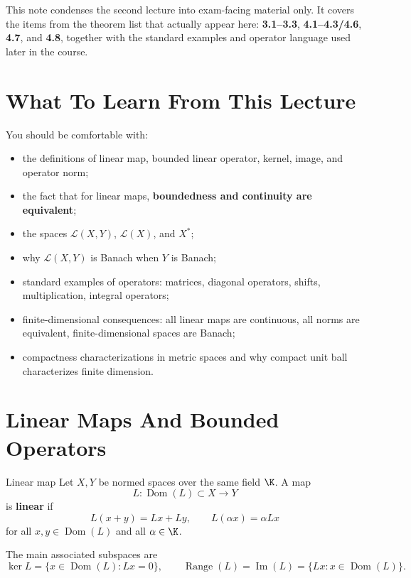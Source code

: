 \documentclass[11pt]{article}
\begin{document}

\vspace{0.8em}

\begin{focusbox}
This note condenses the second lecture into exam-facing material only. It covers the items from the theorem list that actually appear here: \textbf{3.1--3.3}, \textbf{4.1--4.3/4.6}, \textbf{4.7}, and \textbf{4.8}, together with the standard examples and operator language used later in the course.
\end{focusbox}

\tableofcontents

\section{What To Learn From This Lecture}

\begin{focusbox}
You should be comfortable with:
\begin{itemize}
\item the definitions of linear map, bounded linear operator, kernel, image, and operator norm;
\item the fact that for linear maps, \textbf{boundedness and continuity are equivalent};
\item the spaces $\mathcal L(X,Y)$, $\mathcal L(X)$, and $X^*$;
\item why $\mathcal L(X,Y)$ is Banach when $Y$ is Banach;
\item standard examples of operators: matrices, diagonal operators, shifts, multiplication, integral operators;
\item finite-dimensional consequences: all linear maps are continuous, all norms are equivalent, finite-dimensional spaces are Banach;
\item compactness characterizations in metric spaces and why compact unit ball characterizes finite dimension.
\end{itemize}
\end{focusbox}

\section{Linear Maps And Bounded Operators}

\begin{defbox}{Linear map}
Let $X,Y$ be normed spaces over the same field $\K$. A map
\[
L:\operatorname{Dom}(L)\subset X\to Y
\]
is \textbf{linear} if
\[
L(x+y)=Lx+Ly,
\qquad
L(\alpha x)=\alpha Lx
\]
for all $x,y\in \operatorname{Dom}(L)$ and all $\alpha\in\K$.

The main associated subspaces are
\[
\ker L=\{x\in\operatorname{Dom}(L):Lx=0\},
\qquad
\operatorname{Range}(L)=\operatorname{Im}(L)=\{Lx:x\in\operatorname{Dom}(L)\}.
\]
\end{defbox}
\end{document}
